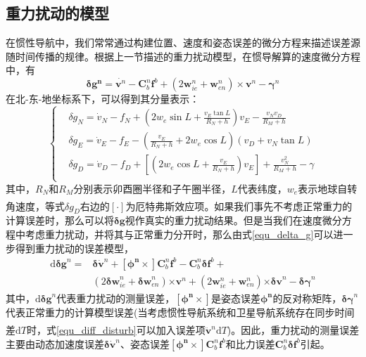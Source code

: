\documentclass[12pt,a4,utf8]{article}
\newcommand{\upcite}[1]{\textsuperscript{\textsuperscript{\cite{#1}}}} %
\begin{document}
\subsection{重力扰动的模型}
在惯性导航中，我们常常通过构建位置、速度和姿态误差的微分方程来描述误差源随时间传播的规律。根据上一节描述的重力扰动模型，在惯导解算的速度微分方程中，有
\begin{equation}
      \bm{\delta g^n} = \dot{\bm{v}^n}-\bm{C}^n_b\bm{f}^b+(2\bm{w}^n_{ie}+\bm{w}^n_{en})\times \bm{v}^n- \bm{\gamma}^n
      \label{equ_delta_g}
\end{equation}
在北-东-地坐标系下，可以得到其分量表示：
\begin{equation}
      \left\{ \begin{aligned}
      & \delta {{g}_{N}}={{{\dot{v}}}_{N}}-{{f}_{N}}+(2{{w}_{e}}\sin L+\frac{{{v}_{E}}\tan L}{{{R}_{N}}+h}){{v}_{E}}-\frac{{{v}_{N}}{{v}_{D}}}{{{R}_{M}}+h} \\ 
      & \delta {{g}_{E}}={{{\dot{v}}}_{E}}-{{f}_{E}}-(\frac{{{v}_{E}}}{{{R}_{N}}+h}+2{{w}_{e}}\cos L)({{v}_{D}}+{{v}_{N}}\tan L) \\ 
      & \delta {{g}_{D}}={{{\dot{v}}}_{D}}-{{f}_{D}}+\left[(2{{w}_{e}}\cos L+\frac{{{v}_{E}}}{{{R}_{N}}+h}){{v}_{E}} \right]+\frac{v_{N}^{2}}{{{R}_{M}}+h}-\gamma  \\ 
\end{aligned} \right.
\label{equ_delta_g_more}
\end{equation}
其中，$R_N$和$R_M$分别表示卯酉圈半径和子午圈半径，$L$代表纬度，$w_{e}$表示地球自转角速度，等式$\delta g_D$右边的$\left[ \cdot  \right]$为厄特弗斯效应项\upcite{harlan1968eotvos}。如果我们事先不考虑正常重力的计算误差时，那么可以将$\bm{\delta g}$视作真实的重力扰动结果。但是当我们在速度微分方程中考虑重力扰动，并将其与正常重力分开时，那么由式\ref{equ_delta_g}可以进一步得到重力扰动的误差模型，
\begin{equation}
      \begin{aligned}
      \text{d}\bm{\delta g}^n = &\bm{\delta} \dot{\bm{v}}^n + \bm{[\phi^n\times]}\bm{C}^n_b \bm{f}^b - \bm{C}^n_b \bm{\delta f}^b + 
      \\
      &(2\bm{\delta w}^n_{ie} +\bm{\delta w}^n_{en})\bm{\times v}^n+(2\bm{w}^n_{ie} + \bm{w}^n_{en})\bm{\times \delta v}^n - \bm{\delta \gamma}^n
      \end{aligned}
      \label{equ_diff_disturb}
\end{equation}
其中，$\text{d}\bm{\delta g}^n$代表重力扰动的测量误差，$\bm{[\phi^n \times]}$是姿态误差$\bm{\phi^n}$的反对称矩阵，$\bm{\delta \gamma}^n$代表正常重力的计算模型误差(当考虑惯性导航系统和卫星导航系统存在同步时间差$\text{d}T$时\upcite{schwarz1995some}，式\ref{equ_diff_disturb}可以加入误差项$\ddot{\bm{v}}^n\text{d}T$)。因此，重力扰动的测量误差主要由动态加速度误差$\bm{\delta} \dot{\bm{v}}^n$、姿态误差$\bm{[\phi^n\times]}\bm{C}^n_b \bm{f}^b$和比力误差$\bm{C}^n_b \bm{\delta f}^b$引起。
\end{document}
